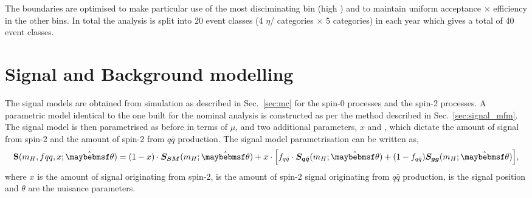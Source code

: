 The \abscostheta boundaries are optimised to make particular use of the most disciminating 
bin (high \abscostheta) and to maintain uniform acceptance $\times$ efficiency in the 
other bins. In total the analysis is split into 20 event classes (4 $\eta$/\rnine\xspace 
categories $\times$ 5 \abscostheta categories) in each year which gives a total of 40 event classes.

\section{Signal and Background modelling}

The signal models are obtained from \MC simulation as described in Sec.~\ref{sec:mc} for the spin-0 \SM processes and the spin-2 processes. A parametric model identical to the one built for the nominal analysis is constructed as per the method described in Sec.~\ref{sec:signal_mfm}. The signal model is then parametrised as before in terms of $\mu$, \mH and two additional parameters, $x$ and \fqqbar, which dictate the amount of signal from spin-2 and the amount of spin-2 from $q\bar{q}$ production. The signal model parametrisation can be written as,
\begin{equation}
  \textbf{S}(m_{H},fqq,x;\hat{\theta}) = (1-x)\cdot\boldsymbol{S_{SM}}(m_{H};\hat{\theta})  + x\cdot\Bigl[f_{q\bar{q}}\cdot \boldsymbol{S_{q\bar{q}}}(m_{H};\hat{\theta}) + (1-f_{q\bar{q}})\boldsymbol{S_{gg}}(m_{H};\hat{\theta})\Bigr],  
  \label{eq:spin_sig}
\end{equation}
where $x$ is the amount of signal originating from spin-2, \fqqbar is the amount of spin-2 signal originating from $q\bar{q}$ production, \mH is the signal position and $\theta$ are the nuisance parameters.

